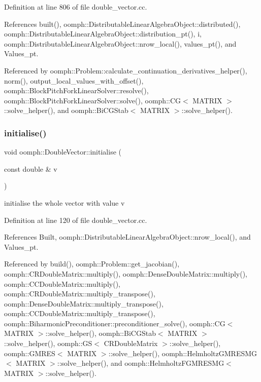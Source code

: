 Definition at line 806 of file double\+\_\+vector.\+cc.



References built(), oomph\+::\+Distributable\+Linear\+Algebra\+Object\+::distributed(), oomph\+::\+Distributable\+Linear\+Algebra\+Object\+::distribution\+\_\+pt(), i, oomph\+::\+Distributable\+Linear\+Algebra\+Object\+::nrow\+\_\+local(), values\+\_\+pt(), and Values\+\_\+pt.



Referenced by oomph\+::\+Problem\+::calculate\+\_\+continuation\+\_\+derivatives\+\_\+helper(), norm(), output\+\_\+local\+\_\+values\+\_\+with\+\_\+offset(), oomph\+::\+Block\+Pitch\+Fork\+Linear\+Solver\+::resolve(), oomph\+::\+Block\+Pitch\+Fork\+Linear\+Solver\+::solve(), oomph\+::\+C\+G$<$ M\+A\+T\+R\+I\+X $>$\+::solve\+\_\+helper(), and oomph\+::\+Bi\+C\+G\+Stab$<$ M\+A\+T\+R\+I\+X $>$\+::solve\+\_\+helper().

\mbox{\label{classoomph_1_1DoubleVector_a180c1057a29f4ed721da46040a619ecd}} 
\subsubsection{\texorpdfstring{initialise()}{initialise()}\hspace{0.1cm}{\footnotesize\ttfamily [1/2]}}
{\footnotesize\ttfamily void oomph\+::\+Double\+Vector\+::initialise (\begin{DoxyParamCaption}\item[{const double \&}]{v }\end{DoxyParamCaption})}



initialise the whole vector with value v 



Definition at line 120 of file double\+\_\+vector.\+cc.



References Built, oomph\+::\+Distributable\+Linear\+Algebra\+Object\+::nrow\+\_\+local(), and Values\+\_\+pt.



Referenced by build(), oomph\+::\+Problem\+::get\+\_\+jacobian(), oomph\+::\+C\+R\+Double\+Matrix\+::multiply(), oomph\+::\+Dense\+Double\+Matrix\+::multiply(), oomph\+::\+C\+C\+Double\+Matrix\+::multiply(), oomph\+::\+C\+R\+Double\+Matrix\+::multiply\+\_\+transpose(), oomph\+::\+Dense\+Double\+Matrix\+::multiply\+\_\+transpose(), oomph\+::\+C\+C\+Double\+Matrix\+::multiply\+\_\+transpose(), oomph\+::\+Biharmonic\+Preconditioner\+::preconditioner\+\_\+solve(), oomph\+::\+C\+G$<$ M\+A\+T\+R\+I\+X $>$\+::solve\+\_\+helper(), oomph\+::\+Bi\+C\+G\+Stab$<$ M\+A\+T\+R\+I\+X $>$\+::solve\+\_\+helper(), oomph\+::\+G\+S$<$ C\+R\+Double\+Matrix $>$\+::solve\+\_\+helper(), oomph\+::\+G\+M\+R\+E\+S$<$ M\+A\+T\+R\+I\+X $>$\+::solve\+\_\+helper(), oomph\+::\+Helmholtz\+G\+M\+R\+E\+S\+M\+G$<$ M\+A\+T\+R\+I\+X $>$\+::solve\+\_\+helper(), and oomph\+::\+Helmholtz\+F\+G\+M\+R\+E\+S\+M\+G$<$ M\+A\+T\+R\+I\+X $>$\+::solve\+\_\+helper().

